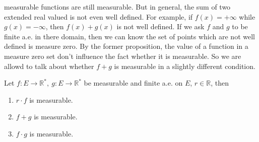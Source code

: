 \documentclass[lang=en, 12pt]{elegantbook}
\newcommand{\RR}{\mathbb{R}}
\begin{document}
        measurable functions are still measurable. But in general, the sum of two extended real valued is not even well defined. For example,
        if $f(x) = +\infty$ while $g(x) = -\infty$, then $f(x) + g(x)$ is not well defined. If we ask $f$ and $g$ to be finite a.e. in there 
        domain, then we can know the set of points which are not well defined is measure zero. By the former proposition, the value of a 
        function in a measure zero set don't influence the fact whether it is measurable. So we are allowd to talk about whether $f + g$ is 
        measurable in a slightly different condition.
            \begin{theorem}
                Let $f:E \to \RR^*, \ g: E \to \RR^*$ be measurable and finite a.e. on $E$, $r \in \RR$, then 
                \begin{enumerate}
                    \item $r \cdot f$ is measurable.
                    \item $f+g$ is measurable.
                    \item $f \cdot g$ is measurable.
                \end{enumerate}  
            \end{theorem}
\end{document}

